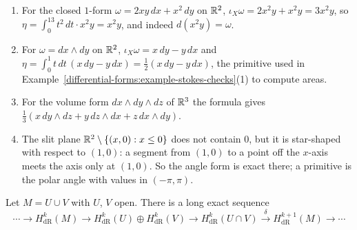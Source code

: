 \begin{example}\label{de-rham:example-explicit-primitives}
\begin{enumerate}
\item For the closed $1$-form $\omega = 2xy\,dx + x^2\,dy$ on $\mathbb{R}^2$, $\iota_X\omega = 2x^2y + x^2y = 3x^2y$, so $\eta = \int_0^13t^2\,dt \cdot x^2y = x^2y$, and indeed $d(x^2y) = \omega$.
\item For $\omega = dx \wedge dy$ on $\mathbb{R}^2$, $\iota_X\omega = x\,dy - y\,dx$ and $\eta = \int_0^1t\,dt\,(x\,dy - y\,dx) = \frac12(x\,dy - y\,dx)$, the primitive used in
Example~\ref{differential-forms:example-stokes-checks}(1) to compute areas.
\item For the volume form $dx \wedge dy \wedge dz$ of $\mathbb{R}^3$ the formula gives $\frac13(x\,dy \wedge dz + y\,dz \wedge dx + z\,dx \wedge dy)$.
\item The slit plane $\mathbb{R}^2 \setminus \{(x, 0) : x \leq 0\}$ does not contain $0$, but it is star-shaped with respect to $(1, 0)$: a segment from $(1, 0)$ to a point off the
$x$-axis meets the axis only at $(1, 0)$. So the angle form is exact there; a primitive is the polar angle with values in $(-\pi, \pi)$.
\end{enumerate}
\end{example}

\begin{theorem}\label{de-rham:theorem-mayer-vietoris}
Let $M = U \cup V$ with $U$, $V$ open. There is a long exact sequence
\[
\cdots \to H^k_{\mathrm{dR}}(M) \to H^k_{\mathrm{dR}}(U) \oplus H^k_{\mathrm{dR}}(V) \to H^k_{\mathrm{dR}}(U \cap V) \xrightarrow{\ \delta\ } H^{k+1}_{\mathrm{dR}}(M) \to \cdots
\]
\end{theorem}

